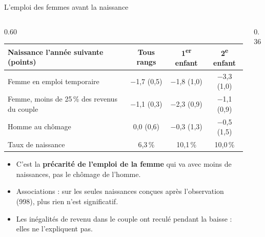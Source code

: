 \documentclass[10pt,aspectratio=169]{beamer}
\begin{document}
\begin{frame}{L'emploi des femmes avant la naissance}
  \begin{columns}[T]
    \begin{column}{0.60\textwidth}
      \scriptsize\setlength{\tabcolsep}{3pt}
      \begin{tabular}{@{}lccc@{}}
        \toprule
        Naissance l'année suivante (points) & Tous rangs & 1\textsuperscript{er} enfant & 2\textsuperscript{e} enfant \\
        \midrule
        Femme en emploi temporaire & $-$1,7 (0,5) & $-$1,8 (1,0) & $-$3,3 (1,0) \\
        Femme, moins de 25\,\% des revenus du couple & $-$1,1 (0,3) & $-$2,3 (0,9) & $-$1,1 (0,9) \\
        Homme au chômage & 0,0 (0,6) & $-$0,3 (1,3) & $-$0,5 (1,5) \\
        \midrule
        Taux de naissance & 6,3\,\% & 10,1\,\% & 10,0\,\% \\
        \bottomrule
      \end{tabular}
      \vspace{0.25cm}

      \small
      \begin{itemize}\setlength{\itemsep}{0.3em}
        \item C'est la \textbf{précarité de l'emploi de la femme} qui va avec moins de naissances, pas le chômage de l'homme.
        \item Associations : sur les seules naissances conçues après l'observation (998), plus rien n'est significatif.
        \item Les inégalités de revenu dans le couple ont reculé pendant la baisse : elles ne l'expliquent pas.
      \end{itemize}
    \end{column}
    \begin{column}{0.36\textwidth}
      \vspace{0.1cm}
    \end{column}
  \end{columns}
\end{frame}
\end{document}
